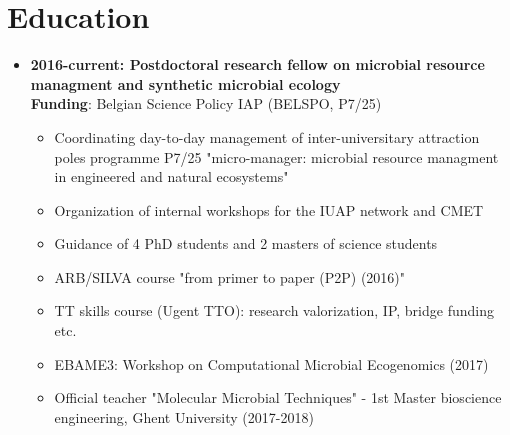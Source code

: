 \documentclass[a4paper,11pt,oneside]{article}
\begin{document}
\section*{Education}
\begin{itemize}
\item \textbf{2016-current: Postdoctoral research fellow on microbial resource managment and synthetic microbial ecology}\\
\textbf{Funding}: Belgian Science Policy IAP (BELSPO, P7/25)
    \begin{itemize}
      \item Coordinating day-to-day management of inter-universitary attraction poles programme P7/25 "micro-manager: microbial resource managment in engineered and natural ecosystems"
      \item Organization of internal workshops for the IUAP network and CMET
      \item Guidance of 4 PhD students and 2 masters of science students
      \item ARB/SILVA course "from primer to paper (P2P) (2016)"
      \item TT skills course (Ugent TTO): research valorization, IP, bridge funding etc.
      \item EBAME3: Workshop on Computational Microbial Ecogenomics (2017)
      \item Official teacher "Molecular Microbial Techniques" - 1st Master bioscience engineering, Ghent University (2017-2018)
    \end{itemize}


\end{itemize}
\end{document}
